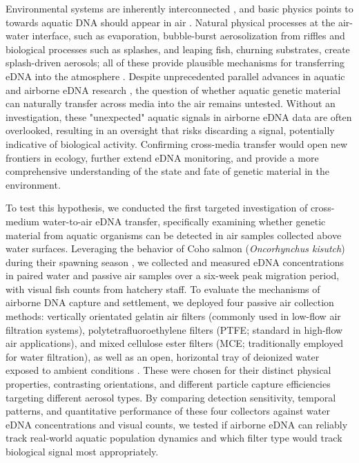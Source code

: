 \documentclass{article}
\begin{document}
Environmental systems are inherently interconnected \cite{folke2021}, and basic physics points to towards aquatic DNA should appear in air \cite{monahan1986, seinfeld2016}. Natural physical processes at the air-water interface, such as evaporation, bubble-burst aerosolization from riffles and biological processes such as splashes, and leaping fish, churning substrates, create splash-driven aerosols; all of these provide plausible mechanisms for transferring eDNA into the atmosphere \cite{duchemin2002, mueller2008, stell2020, vandijk2003}. Despite unprecedented parallel advances in aquatic and airborne eDNA research \cite{altermatt2025, klepke2022, johnson2024, lynggaard2023}, the question of whether aquatic genetic material can naturally transfer across media into the air remains untested. Without an investigation, these "unexpected" aquatic signals in airborne eDNA data are often overlooked, resulting in an oversight that risks discarding a signal, potentially indicative of biological activity. Confirming cross-media transfer would open new frontiers in ecology, further extend eDNA monitoring, and provide a more comprehensive understanding of the state and fate of genetic material in the environment.

To test this hypothesis, we conducted the first targeted investigation of cross-medium water-to-air eDNA transfer, specifically examining whether genetic material from aquatic organisms can be detected in air samples collected above water surfaces. Leveraging the behavior of Coho salmon (\textit{Oncorhynchus kisutch}) during their spawning season \cite{mueller2008}, we collected and measured eDNA concentrations in paired water and passive air samples over a six-week peak migration period, with visual fish counts from hatchery staff. To evaluate the mechanisms of airborne DNA capture and settlement, we deployed four passive air collection methods: vertically orientated gelatin air filters (commonly used in low-flow air filtration systems), polytetrafluoroethylene filters (PTFE; standard in high-flow air applications), and mixed cellulose ester filters (MCE; traditionally employed for water filtration), as well as an open, horizontal tray of deionized water exposed to ambient conditions \cite{klepke2022}. These were chosen for their distinct physical properties, contrasting orientations, and different particle capture efficiencies targeting different aerosol types. By comparing detection sensitivity, temporal patterns, and quantitative performance of these four collectors against water eDNA concentrations and visual counts, we tested if airborne eDNA can reliably track real-world aquatic population dynamics and which filter type would track biological signal most appropriately.
\end{document}
